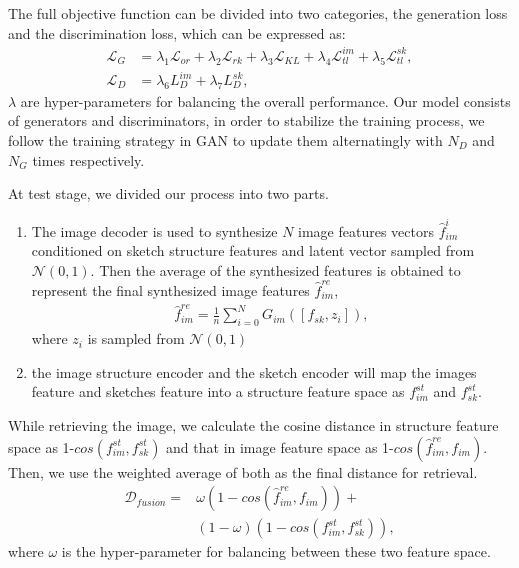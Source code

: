 \documentclass[10pt,twocolumn,letterpaper]{article}
\begin{document}
The full objective function can be divided into two categories, the generation loss and the discrimination loss, which can be expressed as:
\begin{align}
    \mathcal{L}_{G} \!&=\! \lambda_1 \mathcal{L}_{or} \!+\! \lambda_2 \mathcal{L}_{rk} \!+\! \lambda_3 \mathcal{L}_{KL} \!+\! \lambda_4 \mathcal{L}_{tl}^{im} \!+\! \lambda_5 \mathcal{L}_{tl}^{sk}, \\
    \mathcal{L}_{D} &= \lambda_6 L_{D}^{im} \!+\! \lambda_7 L_{D}^{sk},
\end{align}
$\lambda$ are hyper-parameters for balancing the overall performance. 
Our model consists of generators and discriminators, in order to stabilize the training process, we follow the training strategy in GAN \cite{goodfellow2014generative} to update them alternatingly with $N_{D}$ and $N_{G}$ times respectively.

At test stage, we divided our process into two parts.
\begin{enumerate}
    \item The image decoder is used to synthesize $N$ image features vectors $\hat{f}_{im}^{i}$ conditioned on sketch structure features and latent vector sampled from $\mathcal{N}(0,1)$. Then the average of the synthesized features is obtained to represent the final synthesized image features $\hat{f}_{im}^{re}$,
    \begin{align}
        \hat{f}_{im}^{re} = \frac{1}{n}\sum_{i=0}^{N}G_{im}([f_{sk}, z_i]),
    \end{align}
    where $z_i$ is sampled from $\mathcal{N}(0, 1)$
    \item the image structure encoder and the sketch encoder will map the images feature and sketches feature into a structure feature space as $f^{st}_{im}$ and $f^{st}_{sk}$.
\end{enumerate}

While retrieving the image, we calculate the cosine distance in structure feature space as 1-$cos(f^{st}_{im}, f^{st}_{sk})$ and that in image feature space as 1-$cos(\hat{f}_{im}^{re}, f_{im})$. Then, we use the weighted average of both as the final distance for retrieval.
\begin{equation}
\begin{aligned}
	\mathcal{D}_{fusion} =& \omega (1\!-\!cos(\hat{f}_{im}^{re}, f_{im})) +  \\
	& (1\!-\!\omega) (1\!-\!cos(f^{st}_{im}, f^{st}_{sk})), 
\end{aligned}
\end{equation}
where $\omega$ is the hyper-parameter for balancing between these two feature space.
\end{document}
